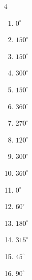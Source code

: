 \begin{multicols}{4}
\begin{enumerate}
  \item $\displaystyle 0^{\circ}$
        \phantom{$\displaystyle =0$}

  \item $\displaystyle 150^{\circ}$

  \item $\displaystyle 150^{\circ}$

  \item $\displaystyle 300^{\circ}$

  \item $\displaystyle 150^{\circ}$

  \item $\displaystyle 360^{\circ}$
        \phantom{$\displaystyle =2\pi$}

  \item $\displaystyle 270^{\circ}$

  \item $\displaystyle 120^{\circ}$

  \item $\displaystyle 300^{\circ}$

  \item $\displaystyle 360^{\circ}$
        \phantom{$\displaystyle =2\pi$}

  \item $\displaystyle 0^{\circ}$
        \phantom{$\displaystyle =0$}

  \item $\displaystyle 60^{\circ}$

  \item $\displaystyle 180^{\circ}$
        \phantom{$\displaystyle =\pi$}

  \item $\displaystyle 315^{\circ}$

  \item $\displaystyle 45^{\circ}$

  \item $\displaystyle 90^{\circ}$


\end{enumerate}
\end{multicols}
